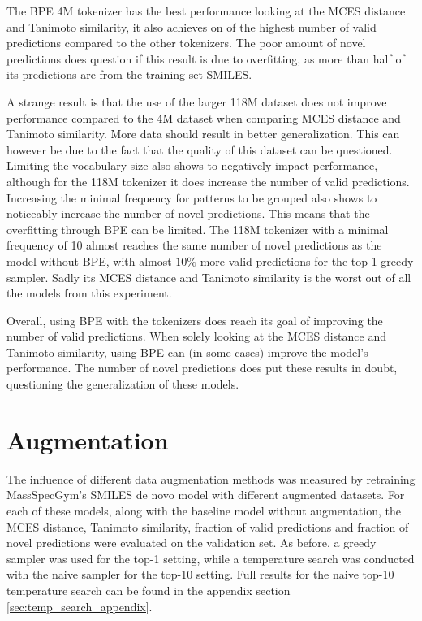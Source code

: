 The \ac{BPE} 4M tokenizer has the best performance looking at the MCES distance and Tanimoto similarity, it also achieves on of the highest number of valid predictions compared to the other tokenizers.
The poor amount of novel predictions does question if this result is due to overfitting, as more than half of its predictions are from the training set SMILES.

A strange result is that the use of the larger 118M dataset does not improve performance compared to the 4M dataset when comparing MCES distance and Tanimoto similarity.
More data should result in better generalization.
This can however be due to the fact that the quality of this dataset can be questioned.
Limiting the vocabulary size also shows to negatively impact performance, although for the 118M tokenizer it does increase the number of valid predictions.
Increasing the minimal frequency for patterns to be grouped also shows to noticeably increase the number of novel predictions.
This means that the overfitting through \ac{BPE} can be limited.
The 118M tokenizer with a minimal frequency of 10 almost reaches the same number of novel predictions as the model without \ac{BPE}, with almost $10\%$ more valid predictions for the top-1 greedy sampler.
Sadly its MCES distance and Tanimoto similarity is the worst out of all the models from this experiment.

Overall, using \ac{BPE} with the tokenizers does reach its goal of improving the number of valid predictions.
When solely looking at the MCES distance and Tanimoto similarity, using \ac{BPE} can (in some cases) improve the model's performance.
The number of novel predictions does put these results in doubt, questioning the generalization of these models.

\section{Augmentation}

The influence of different data augmentation methods was measured by retraining MassSpecGym's SMILES de novo model with different augmented datasets.
For each of these models, along with the baseline model without augmentation, the MCES distance, Tanimoto similarity, fraction of valid predictions and fraction of novel predictions were evaluated on the validation set.
As before, a greedy sampler was used for the top-1 setting, while a temperature search was conducted with the naive sampler for the top-10 setting.
Full results for the naive top-10 temperature search can be found in the appendix section \ref{sec:temp_search_appendix}.

